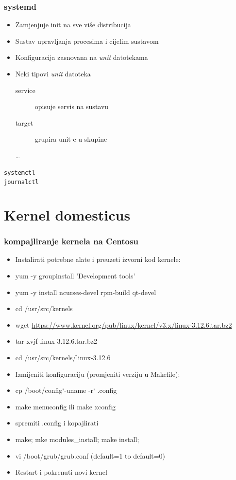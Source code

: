 \documentclass[t]{beamer}
\begin{document}
\begin{frame}
	\frametitle{systemd}
	\begin{itemize}
		\item Zamjenjuje init na sve više distribucija
		\item Sustav upravljanja procesima i cijelim sustavom
	\end{itemize}
	\begin{itemize}
		\item Konfiguracija zasnovana na \emph{unit} datotekama
		\item Neki tipovi \emph{unit} datoteka
		\begin{description}
			\item[service] opisuje servis na sustavu
			\item[target] grupira unit-e u skupine
			\item[\dots]
		\end{description}
	\end{itemize}
	\vfill
	\texttt{systemctl} \\ \texttt{journalctl}
\end{frame}

\section{Kernel domesticus}
\frametitle{kompajliranje kernela na Centosu}
\begin{frame}
    \begin{itemize}
    \item Instalirati potrebne alate i preuzeti izvorni kod kernele:
    \item yum -y groupinstall 'Development tools'
    \item yum -y install ncurses-devel rpm-build qt-devel
    \item cd /usr/src/kernels
    \item wget \url{https://www.kernel.org/pub/linux/kernel/v3.x/linux-3.12.6.tar.bz2}
    \item tar xvjf linux-3.12.6.tar.bz2
    \item cd /usr/src/kernels/linux-3.12.6
    \item Izmijeniti konfiguraciju (promjeniti verziju u Makefile):
    \item cp /boot/config`-uname -r` .config
    \item make menuconfig ili make xconfig
    \item spremiti .config i kopajlirati
    \item make; mke modules\_install; make install;
    \item vi /boot/grub/grub.conf (default=1 to default=0)
    \item Restart i pokrenuti novi kernel
	\end{itemize}
\end{frame}
\end{document}
